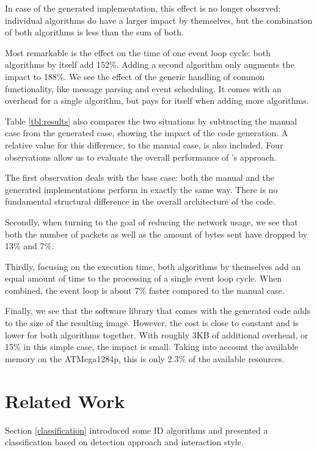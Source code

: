 \documentclass[conference]{IEEEtran}
\begin{document}
In case of the generated implementation, this effect is no longer observed:
individual algorithms do have a larger impact by themselves, but the
combination of both algorithms is less than the sum of both.

Most remarkable is the effect on the time of one event loop cycle: both
algorithms by itself add 152\%. Adding a second algorithm only augments the
impact to 188\%. We see the effect of the generic handling of common
functionality, like message parsing and event scheduling. It comes with an
overhead for a single algorithm, but pays for itself when adding more
algorithms.

Table \ref{tbl:results} also compares the two situations by subtracting the
manual case from the generated case, showing the impact of the code generation.
A relative value for this difference, to the manual case, is also included.
Four observations allow us to evaluate the overall performance of \NAME's
approach.

The first observation deals with the base case: both the manual and the
generated implementations perform in exactly the same way. There is no
fundamental structural difference in the overall architecture of the code.

Secondly, when turning to the goal of reducing the network usage, we see that
both the number of packets as well as the amount of bytes sent have dropped by
13\% and 7\%.

Thirdly, focusing on the execution time, both algorithms by themselves add an
equal amount of time to the processing of a single event loop cycle. When
combined, the event loop is about 7\% faster compared to the manual case.

Finally, we see that the software library that comes with the generated code
adds to the size of the resulting image. However, the cost is close to constant
and is lower for both algorithms together. With roughly 3KB of additional
overhead, or 15\% in this simple case, the impact is small. Taking into account
the available memory on the ATMega1284p, this is only 2.3\% of the available
resources.

\section{Related Work}
\label{related}

Section \ref{classification} introduced some ID algorithms
\cite{ganeriwal2008reputation,mishra2004intrusion,krontiris2009cooperative} and
presented a classification
\cite{mishra2004intrusion,ioannis2007towards,alrajeh2013intrusion} based on
detection approach and interaction style.
\end{document}
